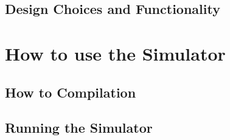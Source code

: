 \documentclass[letterpaper, 11pt, twoside]{article}
\begin{document}
\subsection{Design Choices and Functionality}
\paragraph{}


\clearpage

\section[Simulator Usage]{How to use the Simulator}
\paragraph{}

\subsection[Compilation]{How to Compilation}
\paragraph{}

\subsection[Simulator Command]{Running the Simulator}
\paragraph{}


\end{document}
